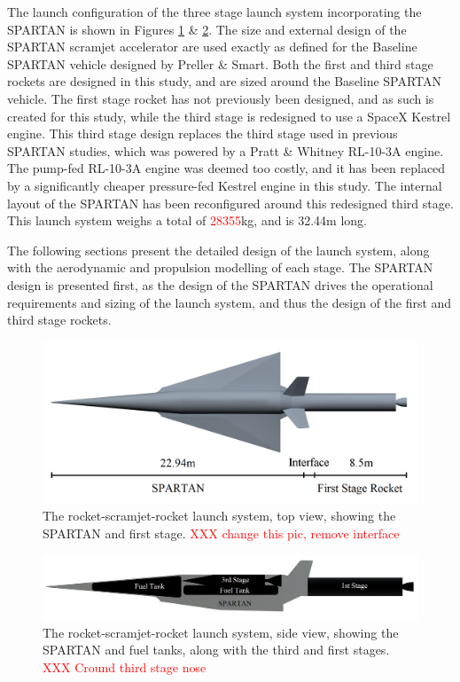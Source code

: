  The launch configuration of the three stage launch system incorporating the SPARTAN is shown in Figures \ref{fig:NoInternal} \& \ref{fig:INTERNALS}. 
 The size and external design of the SPARTAN scramjet accelerator are used exactly as defined for the Baseline SPARTAN vehicle designed by Preller \& Smart\cite{Preller2017b}. Both the first and third stage rockets are designed in this study, and are sized around the Baseline SPARTAN vehicle. 
 The first stage rocket has not previously been designed, and as such is created for this study, while the third stage is redesigned to use a SpaceX Kestrel engine. This third stage design replaces the third stage used in previous SPARTAN studies, which was powered by a Pratt \& Whitney RL-10-3A engine\cite{Preller2017b}. The pump-fed RL-10-3A engine was deemed too costly, and it has been replaced by a significantly cheaper pressure-fed Kestrel engine in this study.  
 The internal layout of the SPARTAN has been reconfigured around this redesigned third stage. 
 This launch system weighs a total of \textcolor{red}{28355}kg, and is 32.44m long. 
 
 The following sections present the detailed design of the launch system, along with the aerodynamic and propulsion modelling of each stage.
The SPARTAN design is presented first, as the design of the SPARTAN drives the operational requirements and sizing of the launch system, and thus the design of the first and third stage rockets. 


\begin{figure}[ht]
	\centering
	\includegraphics[width=0.7\linewidth]{figures/3_vehicle_design/NoInternal}
	\caption{The rocket-scramjet-rocket launch system, top view, showing the SPARTAN and first stage. \textcolor{red}{XXX change this pic, remove interface}}
	\label{fig:NoInternal}
\end{figure}

\begin{figure}[ht]
	\centering
	\includegraphics[width=0.7\linewidth]{figures/3_vehicle_design/INTERNALS}
	\caption{The rocket-scramjet-rocket launch system, side view, showing the SPARTAN and fuel tanks, along with the third and first stages. \textcolor{red}{XXX Cround third stage nose}}
	\label{fig:INTERNALS}
\end{figure}









